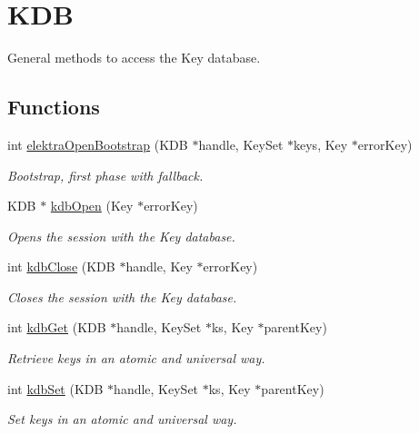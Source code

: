 \hypertarget{group__kdb}{\section{K\+D\+B}
\label{group__kdb}
}


General methods to access the Key database.  


\subsection*{Functions}
\begin{DoxyCompactItemize}
\item 
\hypertarget{group__kdb_ga5bfaad0230457cd6386032fe65c41576}{int \hyperlink{group__kdb_ga5bfaad0230457cd6386032fe65c41576}{elektra\+Open\+Bootstrap} (K\+D\+B $\ast$handle, Key\+Set $\ast$keys, Key $\ast$error\+Key)}\label{group__kdb_ga5bfaad0230457cd6386032fe65c41576}

\begin{DoxyCompactList}\small\item\em Bootstrap, first phase with fallback. \end{DoxyCompactList}\item 
K\+D\+B $\ast$ \hyperlink{group__kdb_ga6808defe5870f328dd17910aacbdc6ca}{kdb\+Open} (Key $\ast$error\+Key)
\begin{DoxyCompactList}\small\item\em Opens the session with the Key database. \end{DoxyCompactList}\item 
int \hyperlink{group__kdb_gadb54dc9fda17ee07deb9444df745c96f}{kdb\+Close} (K\+D\+B $\ast$handle, Key $\ast$error\+Key)
\begin{DoxyCompactList}\small\item\em Closes the session with the Key database. \end{DoxyCompactList}\item 
int \hyperlink{group__kdb_ga28e385fd9cb7ccfe0b2f1ed2f62453a1}{kdb\+Get} (K\+D\+B $\ast$handle, Key\+Set $\ast$ks, Key $\ast$parent\+Key)
\begin{DoxyCompactList}\small\item\em Retrieve keys in an atomic and universal way. \end{DoxyCompactList}\item 
int \hyperlink{group__kdb_ga11436b058408f83d303ca5e996832bcf}{kdb\+Set} (K\+D\+B $\ast$handle, Key\+Set $\ast$ks, Key $\ast$parent\+Key)
\begin{DoxyCompactList}\small\item\em Set keys in an atomic and universal way. \end{DoxyCompactList}\end{DoxyCompactItemize}


